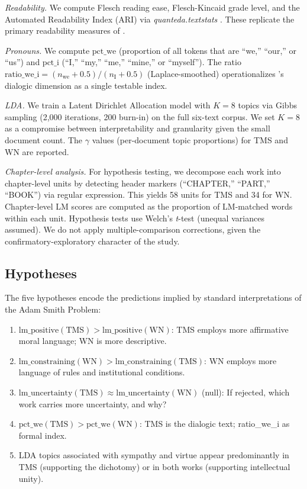 \documentclass[12pt,a4paper]{article}
\begin{document}
\textit{Readability.} We compute Flesch reading ease, Flesch-Kincaid
grade level, and the Automated Readability Index (ARI) via
\textit{quanteda.textstats} \citep{Benoit2018}.
These replicate the primary readability measures of
\citeauthor{Ballandonne2023}.

\textit{Pronouns.} We compute $\text{pct\_we}$ (proportion of all tokens
that are ``we,'' ``our,'' or ``us'') and $\text{pct\_i}$ (``I,'' ``my,''
``me,'' ``mine,'' or ``myself'').
The ratio
$\text{ratio\_we\_i} = (n_{\text{we}} + 0.5) / (n_{\text{I}} + 0.5)$
(Laplace-smoothed) operationalizes \citeauthor{Brown1994}'s dialogic
dimension as a single testable index.

\textit{LDA.} We train a Latent Dirichlet Allocation model
\citep{BleiNgJordan2003} with $K = 8$ topics via Gibbs sampling
(2,000 iterations, 200 burn-in) on the full six-text corpus.
We set $K = 8$ as a compromise between interpretability and granularity
given the small document count.
The $\gamma$ values (per-document topic proportions) for TMS and WN
are reported.

\textit{Chapter-level analysis.} For hypothesis testing, we decompose
each work into chapter-level units by detecting header markers
(``CHAPTER,'' ``PART,'' ``BOOK'') via regular expression.
This yields 58 units for TMS and 34 for WN.
Chapter-level LM scores are computed as the proportion of LM-matched
words within each unit.
Hypothesis tests use Welch's \textit{t}-test (unequal variances assumed).
We do not apply multiple-comparison corrections, given the
confirmatory-exploratory character of the study.

\subsection{Hypotheses}

The five hypotheses encode the predictions implied by standard
interpretations of the Adam Smith Problem:

\begin{enumerate}[label=\textbf{H\arabic*.}]
  \item $\text{lm\_positive}(\text{TMS}) > \text{lm\_positive}(\text{WN})$:
    TMS employs more affirmative moral language; WN is more descriptive.
  \item $\text{lm\_constraining}(\text{WN}) > \text{lm\_constraining}(\text{TMS})$:
    WN employs more language of rules and institutional conditions.
  \item $\text{lm\_uncertainty}(\text{TMS}) \approx \text{lm\_uncertainty}(\text{WN})$ (null):
    If rejected, which work carries more uncertainty, and why?
  \item $\text{pct\_we}(\text{TMS}) > \text{pct\_we}(\text{WN})$:
    TMS is the dialogic text; ratio\_we\_i as formal index.
  \item LDA topics associated with sympathy and virtue appear predominantly
    in TMS (supporting the dichotomy) or in both works
    (supporting intellectual unity).
\end{enumerate}
\end{document}
